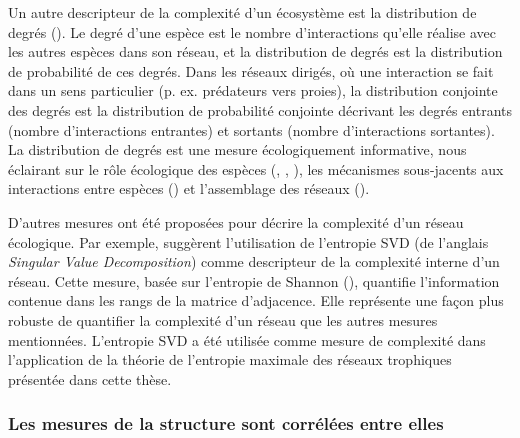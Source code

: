 Un autre descripteur de la complexité d'un écosystème est la distribution de
degrés (\cite{Landi2018Complexity}). Le degré d'une espèce est le nombre
d'interactions qu'elle réalise avec les autres espèces dans son réseau, et la
distribution de degrés est la distribution de probabilité de ces degrés. Dans
les réseaux dirigés, où une interaction se fait dans un sens particulier (p. ex.
prédateurs vers proies), la distribution conjointe des degrés est la
distribution de probabilité conjointe décrivant les degrés entrants (nombre
d'interactions entrantes) et sortants (nombre d'interactions sortantes). La
distribution de degrés est une mesure écologiquement informative, nous éclairant
sur le rôle écologique des espèces (\cite{Sole2001Complexity},
\cite{Dunne2002Network}, \cite{Memmott2004Tolerance}), les mécanismes
sous-jacents aux interactions entre espèces (\cite{Williams2011Biology}) et
l'assemblage des réseaux (\cite{Vazquez2005Degree}).

D'autres mesures ont été proposées pour décrire la complexité d'un réseau
écologique. Par exemple, \textcite{Strydom2021Svd} suggèrent l'utilisation de
l'entropie SVD (de l'anglais \textit{Singular Value Decomposition}) comme
descripteur de la complexité interne d'un réseau. Cette mesure, basée sur
l'entropie de Shannon (\cite{Shannon1948Mathematical}), quantifie l'information
contenue dans les rangs de la matrice d'adjacence. Elle représente une façon
plus robuste de quantifier la complexité d'un réseau que les autres mesures
mentionnées. L'entropie SVD a été utilisée comme mesure de complexité dans
l'application de la théorie de l'entropie maximale des réseaux trophiques
présentée dans cette thèse. 

\subsubsection{Les mesures de la structure sont corrélées entre elles} 


